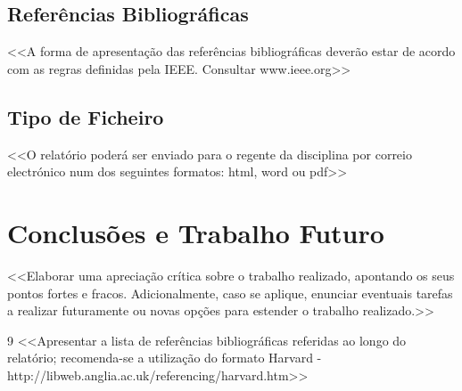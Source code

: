 \documentclass[a4paper,12pt]{scrreprt}
\begin{document}
    \section{Referências Bibliográficas}
        <<A forma de apresentação das referências bibliográficas deverão estar de acordo com as regras definidas pela IEEE. Consultar www.ieee.org>>
    \section{Tipo de Ficheiro}
        <<O relatório poderá ser enviado para o regente da disciplina por correio electrónico num dos seguintes formatos: html, word ou pdf>>
   
        


\chapter{Conclusões e Trabalho Futuro}
    <<Elaborar uma apreciação crítica sobre o trabalho realizado, apontando os seus pontos fortes e fracos. Adicionalmente, caso se aplique, enunciar eventuais tarefas a realizar futuramente ou novas opções para estender o trabalho realizado.>>




\renewcommand\bibname{Referências}

\begin{thebibliography}{9}
<<Apresentar a lista de referências bibliográficas referidas ao longo do relatório; recomenda-se a utilização do formato Harvard - http://libweb.anglia.ac.uk/referencing/harvard.htm>>
\end{thebibliography}
\end{document}
